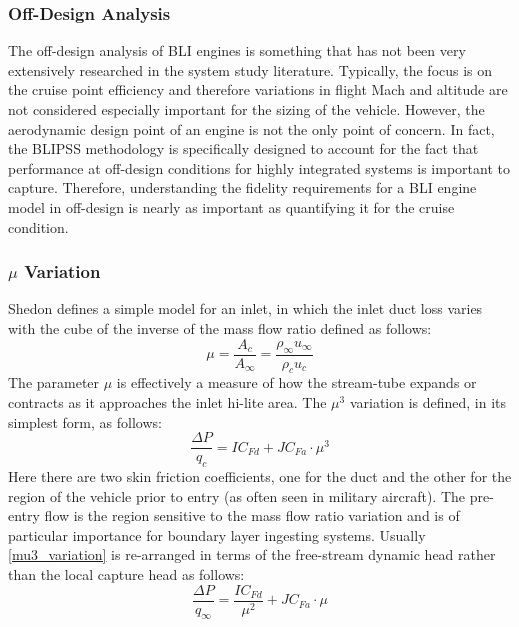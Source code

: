 					\vspace{1pt}
					\vspace{5mm}
	
			\subsubsection{\textbf{Off-Design Analysis}}
				The off-design analysis of BLI engines is something that has not been very extensively researched in the system study literature.  Typically, the focus is on the cruise point efficiency and therefore variations in flight Mach and altitude are not considered especially important for the sizing of the vehicle.  However, the aerodynamic design point of an engine is not the only point of concern.  In fact, the BLIPSS methodology is specifically designed to account for the fact that performance at off-design conditions for highly integrated systems is important to capture.  Therefore, understanding the fidelity requirements for a BLI engine model in off-design is nearly as important as quantifying it for the cruise condition.
	
			\subsubsection{$\mu$ Variation}
				Shedon \cite{Shedon1999} defines a simple model for an inlet, in which the inlet duct loss varies with the cube of the inverse of the mass flow ratio defined as follows:
				\begin{equation}
					\mu = \frac{A_c}{A_\infty} = \frac{\rho_\infty u_\infty}{\rho_c u_c}
				\end{equation}
				The parameter $\mu$ is effectively a measure of how the stream-tube expands or contracts as it approaches the inlet hi-lite area.  The $\mu^3$ variation \cite{Shedon1999} is defined, in its simplest form, as follows:
				\begin{equation}
					\frac{\Delta P}{q_c} = I C_{Fd} + JC_{Fa}\cdot \mu^3 
					\label{mu3_variation}
				\end{equation}
				Here there are two skin friction coefficients, one for the duct and the other for the region of the vehicle prior to entry (as often seen in military aircraft).  The pre-entry flow is the region sensitive to the mass flow ratio variation and is of particular importance for boundary layer ingesting systems.  Usually \ref{mu3_variation} is re-arranged in terms of the free-stream dynamic head rather than the local capture head as follows:
				\begin{equation}
					\frac{\Delta P}{q_\infty} = \frac{I C_{Fd}}{\mu^2} + JC_{Fa}\cdot \mu 
					\label{mu_variation_rearranged}
				\end{equation} 

